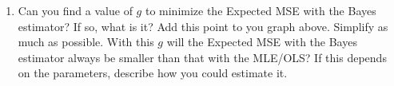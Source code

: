 \documentclass[12pt]{article}
\begin{document}
\begin{enumerate}
 \item Can you find a value of $g$ to minimize the Expected MSE with
   the Bayes estimator?  If so, what is it?  Add this point to you
   graph above.   Simplify as much as
   possible.  With this $g$ will the Expected MSE with the Bayes
   estimator always be smaller than that with the MLE/OLS?  If this depends
   on the parameters, describe how you could estimate it.



 \end{enumerate}
\end{document}
